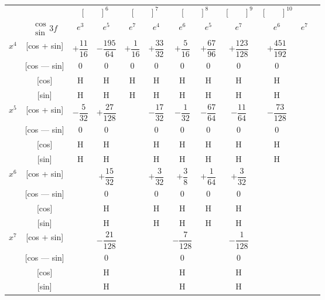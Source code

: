 \documentclass[11pt,a4paper]{book}
\begin{document}
{{%
\newpage
{}

\begin{center}
\small
\begin{tabular}{|c|c|c|c|c|c|c|c|c|c|c|c|}
\hline
& & \multicolumn{2}{c|}{$[\phantom{()}]^6$} & \multicolumn{2}{c|}{$[\phantom{()}]^7$} & \multicolumn{2}{c|}{$[\phantom{()}]^8$} & \multicolumn{1}{c|}{$[\phantom{()}]^9$} & \multicolumn{1}{c|}{$[\phantom{()}]^{10}$} \\
\cline{3-10}
& $\begin{smallmatrix} \cos \\ \sin \end{smallmatrix} 3f$ & $e^3$ & $e^5$ & $e^7$ & $e^4$ & $e^6$ & $e^5$ & $e^7$ & $e^6$ & $e^7$ \\
\hline
\multirow{4}{*}{$x^4$} & [cos + sin] & $+\dfrac{11}{16}$ & $-\dfrac{195}{64}$ & $+\dfrac{1}{16}$ & $+\dfrac{33}{32}$ & $+\dfrac{5}{16}$ & $+\dfrac{67}{96}$ & $+\dfrac{123}{128}$ & $+\dfrac{451}{192}$ \\
& [cos --- sin] & $0$ & $0$ & $0$ & $0$ & $0$ & $0$ & $0$ & $0$ \\
& [cos] & H & H & H & H & H & H & H & H \\
& [sin] & H & H & H & H & H & H & H & H \\
\hline
\multirow{4}{*}{$x^5$} & [cos + sin] & $-\dfrac{5}{32}$ & $+\dfrac{27}{128}$ & & $-\dfrac{17}{32}$ & $-\dfrac{1}{32}$ & $-\dfrac{67}{64}$ & $-\dfrac{11}{64}$ & $-\dfrac{73}{128}$ \\
& [cos --- sin] & $0$ & $0$ & & $0$ & $0$ & $0$ & $0$ & $0$ \\
& [cos] & H & H & & H & H & H & H & H \\
& [sin] & H & H & & H & H & H & H & H \\
\hline
\multirow{4}{*}{$x^6$} & [cos + sin] & & $+\dfrac{15}{32}$ & & $+\dfrac{3}{32}$ & $+\dfrac{3}{8}$ & $+\dfrac{1}{64}$ & $+\dfrac{3}{32}$ \\
& [cos --- sin] & & $0$ & & $0$ & $0$ & $0$ & $0$ \\
& [cos] & & H & & H & H & H & H \\
& [sin] & & H & & H & H & H & H \\
\hline
\multirow{4}{*}{$x^7$} & [cos + sin] & & $-\dfrac{21}{128}$ & & & $-\dfrac{7}{128}$ & & $-\dfrac{1}{128}$ \\
& [cos --- sin] & & $0$ & & & $0$ & & $0$ \\
& [cos] & & H & & & H & & H \\
& [sin] & & H & & & H & & H \\
\hline
\end{tabular}
\end{center}

}}
\end{document}
